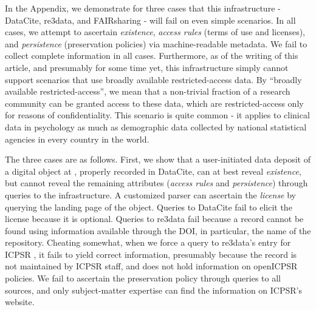 In the Appendix, we demonstrate for three cases that this infrastructure - DataCite, re3data, and FAIRsharing - will fail on even simple scenarios. In all cases, we attempt to ascertain \textit{existence}, \textit{access rules} (terms of use and licenses), and \textit{persistence} (preservation policies) via machine-readable metadata. We fail to collect complete information in  all cases. Furthermore, as of the writing of this article, and presumably for some time yet, this infrastructure simply cannot support scenarios that use broadly available restricted-access data. By ``broadly available restricted-access'', we mean that a non-trivial fraction of a research community can be granted access to these data, which are restricted-access only for reasons of confidentiality. This scenario is quite common - it applies to clinical data in psychology as much as demographic data collected by national statistical agencies in every country in the world. 

The three cases are as follows. First, we show that a user-initiated data deposit of a digital  object at  , properly recorded in DataCite, can at best reveal \textit{existence}, but cannot reveal the remaining attributes (\textit{access rules} and \textit{persistence}) through queries to the infrastructure. A customized parser can ascertain the \textit{license} by querying the landing page of the object. Queries to DataCite fail to elicit the  license because it is optional. Queries to re3data fail because a record cannot be found using information available through the \ac{DOI}, in particular, the name of the repository. Cheating somewhat, when we force a query to re3data's entry for \ac{ICPSR} \parencite{Re3data-icpsr}, it fails to yield correct information, presumably because the record is not maintained by ICPSR staff, and does not hold information on openICPSR policies. We fail to ascertain the preservation policy through queries to all sources, and only subject-matter expertise can find the information on ICPSR's website. 

